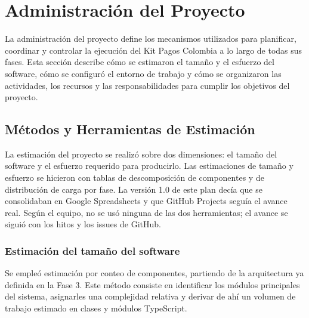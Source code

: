 \section{Administración del Proyecto}

La administración del proyecto define los mecanismos utilizados para planificar, coordinar y controlar la ejecución del Kit Pagos Colombia a lo largo de todas sus fases. Esta sección describe cómo se estimaron el tamaño y el esfuerzo del software, cómo se configuró el entorno de trabajo y cómo se organizaron las actividades, los recursos y las responsabilidades para cumplir los objetivos del proyecto.

\subsection{Métodos y Herramientas de Estimación}

La estimación del proyecto se realizó sobre dos dimensiones: el tamaño del software y el esfuerzo requerido para producirlo. Las estimaciones de tamaño y esfuerzo se hicieron con tablas de descomposición de componentes y de distribución de carga por fase. La versión 1.0 de este plan decía que se consolidaban en Google Spreadsheets y que GitHub Projects seguía el avance real. Según el equipo, no se usó ninguna de las dos herramientas; el avance se siguió con los hitos y los issues de GitHub.

\subsubsection{Estimación del tamaño del software}

Se empleó estimación por conteo de componentes, partiendo de la arquitectura ya definida en la Fase 3. Este método consiste en identificar los módulos principales del sistema, asignarles una complejidad relativa y derivar de ahí un volumen de trabajo estimado en clases y módulos TypeScript.

